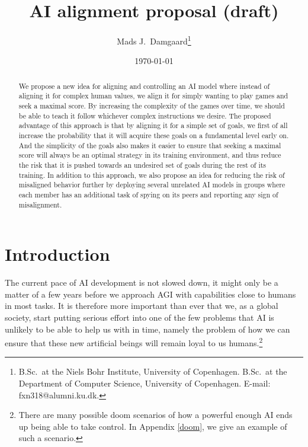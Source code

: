 \documentclass{article}
\title{
	AI alignment proposal (draft)
}
\author{
	Mads J.\ Damgaard\footnote{
		B.Sc.\ at the Niels Bohr Institute, University of Copenhagen.
		B.Sc.\ at the Department of Computer Science, University of Copenhagen.
		E-mail: fxn318@alumni.ku.dk.
	}
}
\date{\today}
\begin{document}
\maketitle


\begin{abstract}

We propose a new idea for aligning and controlling an AI model where instead of aligning it for complex human values, we align it for simply wanting to play games and seek a maximal score. By increasing the complexity of the games over time, we should be able to teach it follow whichever complex instructions we desire. The proposed advantage of this approach is that by aligning it for a simple set of goals, we first of all increase the probability that it will acquire these goals on a fundamental level early on. And the simplicity of the goals also makes it easier to ensure that seeking a maximal score will always be an optimal strategy in its training environment, and thus reduce the risk that it is pushed towards an undesired set of goals during the rest of its training. In addition to this approach, we also propose an idea for reducing the risk of misaligned behavior further by deploying several unrelated AI models in groups where each member has an additional task of spying on its peers and reporting any sign of misalignment.

\end{abstract}





\section{Introduction}

The current pace of AI development is not slowed down, it might only be a matter of a few years before we approach AGI with capabilities close to humans in most tasks. It is therefore more important than ever that we, as a global society, start putting serious effort into one of the few problems that AI is unlikely to be able to help us with in time, namely the problem of how we can ensure that these new artificial beings will remain loyal to us %
humans.\footnote{
	There are many possible doom scenarios of how a powerful enough AI ends up being able to take control. In Appendix \ref{doom}, we give an example of such a scenario. %
}
\end{document}

